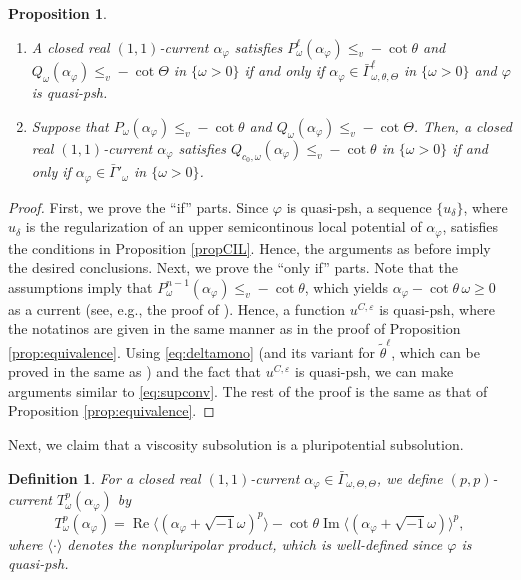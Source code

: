 \documentclass[10pt,a4paper]{amsart}
\numberwithin{equation}{section}
\newtheorem{prop}[equation]{Proposition}
\newtheorem{defn}[equation]{Definition}
\begin{document}
\begin{prop}\label{prop:dhymequivalence}
    \begin{enumerate}[label={\upshape(\roman*)}]
        \item A closed real $(1,1)$-current $\alpha_\varphi$  satisfies $P^\ell_\omega(\alpha_\varphi)\le_v -\cot\theta$ and $Q_\omega(\alpha_\varphi)\le_v -\cot\Theta$ in $\{\omega>0\}$ if and only if $\alpha_\varphi\in\bar{\Gamma}^\ell_{\omega,\theta,\Theta}$ in $\{\omega>0\}$ and $\varphi$ is quasi-psh.
        \item Suppose that $P_\omega(\alpha_\varphi)\le_v -\cot\theta$ and $Q_\omega(\alpha_\varphi)\le_v -\cot\Theta$. Then, a closed real $(1,1)$-current $\alpha_\varphi$ satisfies $Q_{c_0,\omega}(\alpha_\varphi)\le_v-\cot\theta$ in $\{\omega>0\}$ if and only if $\alpha_\varphi\in\bar{\Gamma}'_\omega$ in $\{\omega>0\}$.
    \end{enumerate}
\end{prop}

\begin{proof}
     First, we prove the ``if'' parts. 
     Since $\varphi$ is quasi-psh, a sequence $\{u_\delta\}$, where $u_\delta$ is the regularization of an upper semicontinous local potential of $\alpha_\varphi$, satisfies the conditions in Proposition \ref{propCIL}. Hence, the arguments as before imply the desired conclusions.
     Next, we prove the ``only if'' parts. Note that the assumptions imply that $P^{n-1}_{\omega}(\alpha_\varphi)\le_v-\cot\theta$, which yields $\alpha_\varphi-\cot\theta\, \omega\ge0$ as a current (see, e.g., the proof of \cite[Proposition 1.3]{EGZ}). Hence, a function $u^{C,\varepsilon}$ is quasi-psh, where the notatinos are given in the same manner as in the proof of Proposition \ref{prop:equivalence}. Using \eqref{eq:deltamono} (and its variant for $\tilde{\theta}^\ell$, which can be proved in the same as \cite[Lemma 5.1]{CL}) and the fact that $u^{C,\varepsilon}$ is quasi-psh, we can make arguments similar to \eqref{eq:supconv}.
     The rest of the proof is the same as that of Proposition \ref{prop:equivalence}.
\end{proof}

Next, we claim that a viscosity subsolution is a pluripotential subsolution.

\begin{defn}\label{def:dhymllcurrent}
    For a closed real $(1,1)$-current $\alpha_\varphi\in\bar{\Gamma}_{\omega,\Theta,\Theta}$, we define $(p,p)$-current $T^p_\omega(\alpha_\varphi)$ by
    $$T^p_\omega(\alpha_\varphi)=\operatorname{Re}\langle(\alpha_\varphi+\sqrt{-1}\omega)^p\rangle-\cot\theta\operatorname{Im}\langle(\alpha_\varphi+\sqrt{-1}\omega)\rangle^p,$$
    where $\langle\cdot\rangle$ denotes the nonpluripolar product, which is well-defined since $\varphi$ is quasi-psh.
\end{defn}
\end{document}
